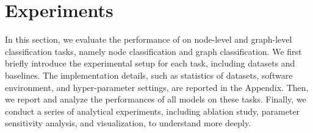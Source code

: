 \documentclass[sigconf, screen]{acmart}
\begin{document}
%
 \section{Experiments}

In this section, we evaluate the performance of \name on node-level and graph-level classification tasks, namely node classification and graph classification. 
We first briefly introduce the experimental setup for each task, including datasets and baselines.
The implementation details, such as statistics of datasets, software environment, and hyper-parameter settings, are reported in the Appendix.
Then, we report and analyze the performances of all models on these tasks. 
Finally, we conduct a series of analytical experiments, including ablation study, parameter sensitivity analysis, and visualization, to understand \name more deeply.
\end{document}
